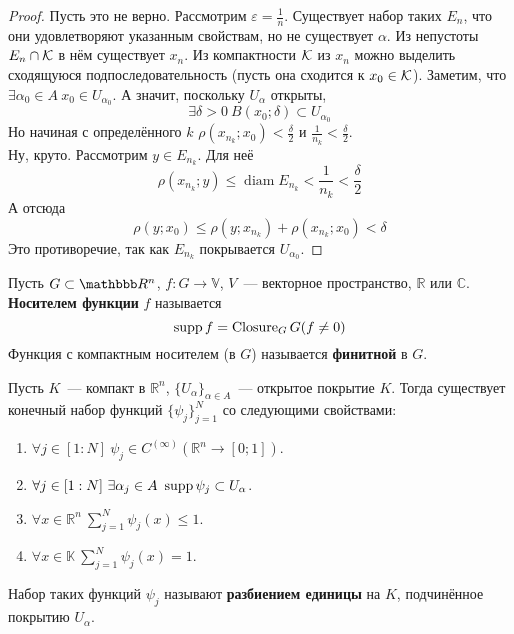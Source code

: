 \documentclass{article}
\let\eps\varepsilon
\begin{document}
    \begin{proof}
        Пусть это не верно. Рассмотрим $\eps=\frac1n$. Существует набор таких $E_n$, что они удовлетворяют указанным свойствам, но не существует $\alpha$. Из непустоты $E_n\cap{\mathcal{K}}$ в нём существует $x_n$. Из компактности ${\mathcal{K}}$ из $x_n$ можно выделить сходящуюся подпоследовательность (пусть она сходится к $x_0\in{\mathcal{K}}$). Заметим, что $\exists\alpha_0\in A~x_0\in U_{\alpha_0}$. А значит, поскольку $U_\alpha$ открыты,
        $$
        \exists\delta>0~B(x_0;\delta)\subset U_{\alpha_0}
        $$
        Но начиная с определённого $k$ $\rho(x_{n_k};x_0)<\frac\delta2$ и $\frac1{n_k}<\frac\delta2$.\\
        Ну, круто. Рассмотрим $y\in E_{n_k}$. Для неё
        $$
        \rho(x_{n_k};y)\leqslant\operatorname{diam}E_{n_k}<\frac1{n_k}<\frac\delta2
        $$
        А отсюда
        $$
        \rho(y;x_0)\leqslant\rho(y;x_{n_k})+\rho(x_{n_k};x_0)<\delta
        $$
        Это противоречие, так как $E_{n_k}$ покрывается $U_{\alpha_0}$.
    \end{proof}
    \begin{definition}
        Пусть $G\subset\mathbbb R^n$, $f\colon G\to\mathbb V$, $V$~--- векторное пространство, $\mathbb R$ или $\mathbb C$. \textbf{Носителем функции} $f$ называется
        $$
        \operatorname{supp} f=\operatorname{Closure}_G G(f\neq0)
        $$
        Функция с компактным носителем (в $G$) называется \textbf{финитной} в $G$.
    \end{definition}
    \begin{theorem}
        \label{Разбиение единицы}
        Пусть $K$~--- компакт в $\mathbb R^n$, $\{U_\alpha\}_{\alpha\in A}$~--- открытое покрытие $K$. Тогда существует конечный набор функций $\{\psi_j\}_{j=1}^N$ со следующими свойствами:
        \begin{enumerate}
            \item $\forall j\in[1:N]~\psi_j\in C^{(\infty)}(\mathbb R^n\to[0;1])$.
            \item $\forall j\in[1:N]~\exists\alpha_j\in A~\operatorname{supp}\psi_j\subset U_\alpha$.
            \item $\forall x\in\mathbb R^n~\sum\limits_{j=1}^N\psi_j(x)\leqslant 1$.
            \item $\forall x\in\mathbb K~\sum\limits_{j=1}^N\psi_j(x)=1$.
        \end{enumerate}
    \end{theorem}
    \begin{definition}
        Набор таких функций $\psi_j$ называют \textbf{разбиением единицы} на $K$, подчинённое покрытию $U_\alpha$.
    \end{definition}
\end{document}
